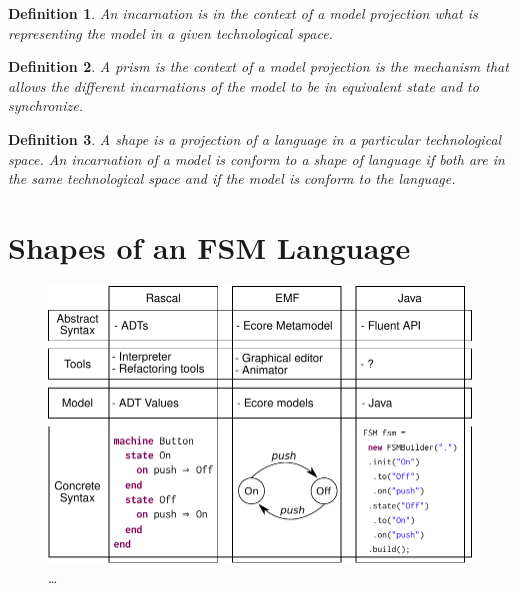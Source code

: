 \documentclass[sigplan]{acmart}
\newtheorem{definition}{Definition}
\begin{document}
\begin{definition}
An incarnation is in the context of a model projection what is representing the model in a given technological space.
\end{definition}

\begin{definition}
A prism is the context of a model projection is the mechanism that allows the different incarnations of the model to be in equivalent state and to synchronize.
\end{definition}

\begin{definition}
A shape is a projection of a language in a particular technological space.
An incarnation of a model is conform to a shape of language if both are in the same technological space and if the model is conform to the language.
\end{definition}

\section{Shapes of an FSM Language}

\begin{figure}
	\centering
	\includegraphics[width=\columnwidth]{figures/concepts-instantiated}
	\caption{\dots}
	\label{fig:concepts-instantiated}
\end{figure}
\end{document}

